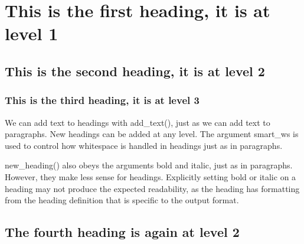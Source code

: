 \documentclass[a4paper]{report}
\begin{document}
\chapter{This is the first heading, it is at level 1}

\section{This is the second heading, it is at level 2}

\subsection{This is the third heading, it is at level 3}

We can add text to headings with add\_text(), just as we can add text to paragraphs. New headings can be added at any level. The argument smart\_ws is used to control how whitespace is handled in headings just as in paragraphs.

new\_heading() also obeys the arguments bold and italic, just as in paragraphs. However, they make less sense for headings. Explicitly setting bold or italic on a heading may not produce the expected readability, as the heading has formatting from the heading definition that is specific to the output format.

\section{The fourth heading is again at level 2}
\end{document}
